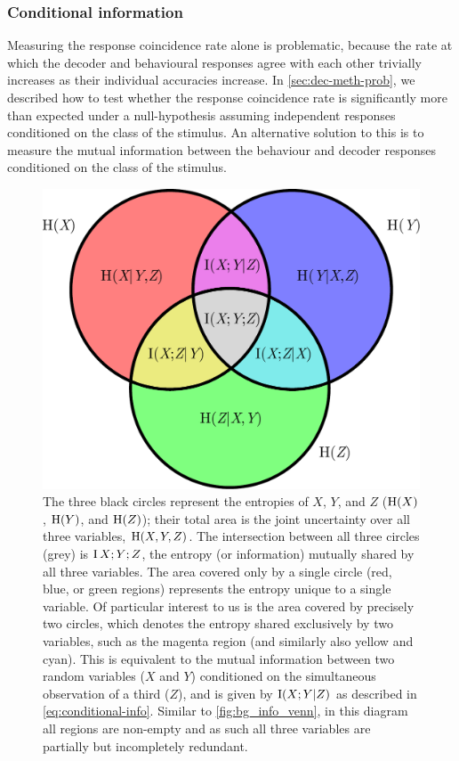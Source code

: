 \subsubsection{Conditional information}

Measuring the response coincidence rate alone is problematic, because the rate at which the decoder and behavioural responses agree with each other trivially increases as their individual accuracies increase.
In \autoref{sec:dec-meth-prob}, we described how to test whether the response coincidence rate is significantly more than expected under a null-hypothesis assuming independent responses conditioned on the class of the stimulus.
An alternative solution to this is to measure the mutual information between the behaviour and decoder responses conditioned on the class of the stimulus.

\begin{figure}[htbp]
\centering
\includegraphics[scale=.5]{figs/venn/conditional-information-diagram.pdf}
\caption{
The three black circles represent the entropies of $X$, $Y$, and $Z$ ($\operatorname{H}(X)$, $\operatorname{H}(Y)$, and $\operatorname{H}(Z)$); their total area is the joint uncertainty over all three variables, $\operatorname{H}(X, Y, Z)$.
The intersection between all three circles (grey) is $\operatorname{I}{X;Y;Z}$, the entropy (or information) mutually shared by all three variables.
The area covered only by a single circle (red, blue, or green regions) represents the entropy unique to a single variable.
Of particular interest to us is the area covered by precisely two circles, which denotes the entropy shared exclusively by two variables, such as the magenta region (and similarly also yellow and cyan).
This is equivalent to the mutual information between two random variables ($X$ and $Y$) conditioned on the simultaneous observation of a third ($Z$), and is given by $\operatorname{I}(X;Y|Z)$ as described in \autoref{eq:conditional-info}.
Similar to \autoref{fig:bg_info_venn}, in this diagram all regions are non-empty and as such all three variables are partially but incompletely redundant.
}
\label{fig:pl_cond_info_venn}
\end{figure}

